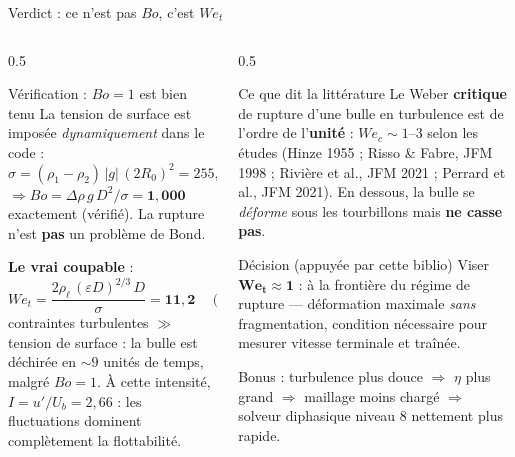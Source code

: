\documentclass[11pt,aspectratio=169]{beamer}
\begin{document}
\begin{frame}{Verdict : ce n'est pas $Bo$, c'est $We_t$}
  \begin{columns}[T]
    \begin{column}{0.5\textwidth}
      \begin{block}{Vérification : $Bo = 1$ est bien tenu}
        \footnotesize
        La tension de surface est imposée \emph{dynamiquement} dans le code :
        $\sigma = (\rho_1{-}\rho_2)\,|g|\,(2R_0)^2 = 255{,}7$
        $\Rightarrow Bo = \Delta\rho\,g\,D^2/\sigma = \mathbf{1{,}000}$
        exactement (vérifié). La rupture n'est \textbf{pas} un problème
        de Bond.
      \end{block}
      \textbf{Le vrai coupable} :
      \[ We_t = \frac{2\rho_\ell\,(\varepsilon D)^{2/3}\,D}{\sigma}
         = \mathbf{11{,}2} \quad (KE{=}200) \]
      contraintes turbulentes $\gg$ tension de surface : la bulle est
      déchirée en $\sim 9$ unités de temps, malgré $Bo=1$.
      À cette intensité, $I = u'/U_b = 2{,}66$ : les fluctuations dominent
      complètement la flottabilité.
    \end{column}
    \begin{column}{0.5\textwidth}
      \begin{block}{Ce que dit la littérature}
        \footnotesize
        Le Weber \textbf{critique} de rupture d'une bulle en turbulence est
        de l'ordre de l'\textbf{unité} : $We_c \sim 1$--$3$ selon les
        études (Hinze 1955 ; Risso \& Fabre, JFM 1998 ; Rivière et al.,
        JFM 2021 ; Perrard et al., JFM 2021). En dessous, la bulle se
        \emph{déforme} sous les tourbillons mais \textbf{ne casse pas}.
      \end{block}
      \begin{block}{Décision (appuyée par cette biblio)}
        Viser $\bm{We_t \approx 1}$ : à la frontière du régime de rupture
        --- déformation maximale \emph{sans} fragmentation, condition
        nécessaire pour mesurer vitesse terminale et traînée.
      \end{block}
      \footnotesize
      Bonus : turbulence plus douce $\Rightarrow$ $\eta$ plus grand
      $\Rightarrow$ maillage moins chargé $\Rightarrow$ solveur diphasique
      niveau 8 nettement plus rapide.
    \end{column}
  \end{columns}
\end{frame}

\end{document}
